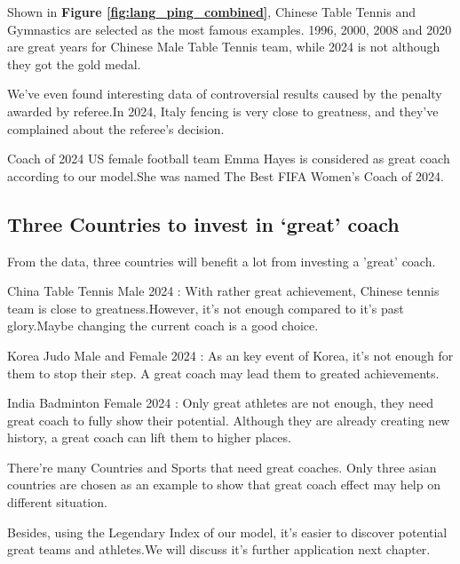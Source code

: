 Shown in \textbf{Figure \ref{fig:lang_ping_combined}}, Chinese Table Tennis and Gymnastics are selected as the most famous examples. 1996, 2000, 2008 and 2020 are great years for Chinese Male Table Tennis team, while 2024 is not although they got the gold medal.

We've even found interesting data of controversial results caused by the penalty awarded by referee.In 2024, Italy fencing is very close to greatness, and they've complained about the referee's decision.\cite{4}

Coach of 2024 US female football team Emma Hayes is considered as great coach according to our model.She was named The Best FIFA Women's Coach of 2024.\cite{5}

\subsection{Three Countries to invest in `great' coach}

From the data, three countries will benefit a lot from investing a 'great' coach.

China Table Tennis Male 2024 : With rather great achievement, Chinese tennis team is close to greatness.However, it's not enough compared to it's past glory.Maybe changing the current coach is a good choice.

Korea Judo Male and Female 2024 : As an key event of Korea, it's not enough for them to stop their step. A great coach may lead them to greated achievements.

India Badminton Female 2024 : Only great athletes are not enough, they need great coach to fully show their potential. Although they are already creating new history, a great coach can lift them to higher places.

There're many Countries and Sports that need great coaches. Only three asian countries are chosen as an example to show that  great coach effect may help on different situation.

Besides, using the Legendary Index of our model, it's easier to discover potential great teams and athletes.We will discuss it's further application next chapter.
